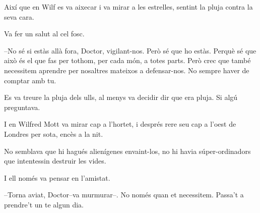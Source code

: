 Així que en Wilf es va aixecar i va mirar a les estrelles, sentint la
pluja contra la seva cara.

Va fer un salut al cel fosc.

--No sé si estàs allà fora, Doctor, vigilant-nos. Però sé que ho estàs.
Perquè sé que això és el que fas per tothom, per cada món, a totes
parts. Però crec que també necessitem aprendre per nosaltres mateixos a
defensar-nos. No sempre haver de comptar amb tu.

Es va treure la pluja dels ulls, al menys va decidir dir que era pluja.
Si algú preguntava.

I en Wilfred Mott va mirar cap a l'hortet, i després rere seu cap a
l'oest de Londres per sota, encès a la nit.

No semblava que hi hagués alienígenes envaint-los, no hi havia
súper-ordinadors que intentessin destruir les vides.

I ell només va pensar en l'amistat.

--Torna aviat, Doctor--va murmurar--. No només quan et necessitem.
Passa't a prendre't un te algun dia.